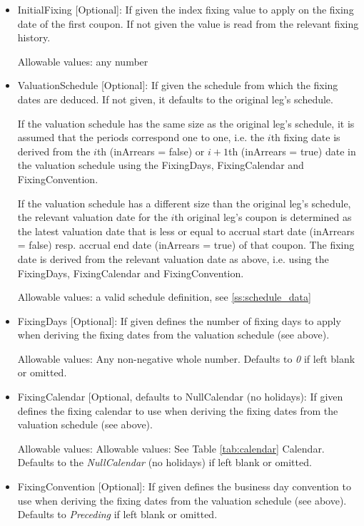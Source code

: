 \begin{itemize}
\begin{itemize}
\item InitialFixing [Optional]: If given the index fixing value to apply on the fixing date of the first coupon. If not
  given the value is read from the relevant fixing history.

  Allowable values: any number

\item ValuationSchedule [Optional]: If given the schedule from which the fixing dates are deduced. If not given, it
  defaults to the original leg's schedule.

  If the valuation schedule has the same size as the original leg's schedule,
  it is assumed that the periods correspond one to one, i.e. the $i$th fixing date is derived from the $i$th (inArrears
  = false) or $i+1$th (inArrears = true) date in the valuation schedule using the FixingDays, FixingCalendar and
  FixingConvention.

  If the valuation schedule has a different size than the original leg's schedule, the relevant valuation date for the
  $i$th original leg's coupon is determined as the latest valuation date that is less or equal to accrual start date
  (inArrears = false) resp. accrual end date (inArrears = true) of that coupon. The fixing date is derived from the
  relevant valuation date as above, i.e. using the FixingDays, FixingCalendar and FixingConvention.

  Allowable values: a valid schedule definition, see \ref{ss:schedule_data}

\item FixingDays [Optional]: If given defines the number of fixing days to apply when deriving the fixing
  dates from the valuation schedule (see above).

  Allowable values: Any non-negative whole number. Defaults to \emph{0} if left blank or omitted. 

\item FixingCalendar [Optional, defaults to NullCalendar (no holidays): If given defines the fixing calendar to use when
  deriving the fixing dates from the valuation schedule (see above).

  Allowable values:   Allowable values: See Table \ref{tab:calendar} Calendar. Defaults to the \emph{NullCalendar} (no holidays) if left blank or omitted.

\item FixingConvention [Optional]: If given defines the business day convention to use when
  deriving the fixing dates from the valuation schedule (see above). Defaults to  \emph{Preceding} if left blank or omitted.


\end{itemize}
\end{itemize}

